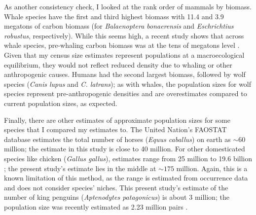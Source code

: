 \documentclass[11pt]{article}
\begin{document}
As another consistency check, I looked at the rank order of mammals by biomass.
Whale species have the first and third highest biomass with 11.4 and 3.9
megatons of carbon biomass (for \emph{Balaenoptera bonaerensis} and
\emph{Eschrichtius robustus}, respectively). While this seems high, a recent
study shows that across whale species, pre-whaling carbon biomass was at the
tens of megatons level \parencite[Table 1 and Figure 1]{Pershing2010-fh}.
Given that my census size estimates represent populations at a macroecological
equilibrium, they would not reflect reduced density due to whaling or other
anthropogenic causes. Humans had the second largest biomass, followed by wolf
species (\emph{Canis lupus} and \emph{C. latrans}); as with whales, the
population sizes for wolf species represent pre-anthropogenic densities and are
overestimates compared to current population sizes, as expected. 

Finally, there are other estimates of approximate population sizes for some
species that I compared my estimates to. The United Nation's FAOSTAT database
estimates the total number of horses (\emph{Equus caballus}) on earth as
$\mathord{\sim}60$ million; the estimate in this study is close to 40 million.
For other domesticated species like chicken (\emph{Gallus gallus}), estimates
range from 25 million to 19.6 billion
\parencite{noauthor_2021-gc,Robinson2014-sx}; the present study's estimate lies
in the middle at $\mathord{\sim}175$ million. Again, this is a known limitation
of this method, as the range is estimated from occurrence data and does not
consider species' niches. This present study's estimate of the number of king
penguins (\emph{Aptenodytes patagonicus}) is about 3 million; the population
size was recently estimated as 2.23 million pairs \parencite{Shirihai2008-ft}.
\end{document}
